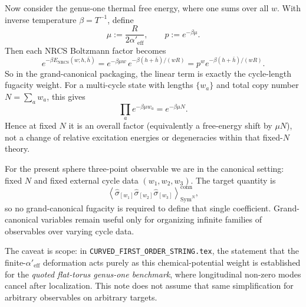 \documentclass[11pt]{article}
\newcommand{\Sym}{\mathrm{Sym}}
\newcommand{\Aeff}{\alpha'_{\mathrm{eff}}}
\begin{document}
Now consider the genus-one thermal free energy, where one sums over all $w$. With inverse temperature $\beta=T^{-1}$, define
\begin{equation}
\mu:=\frac{R}{2\Aeff},
\qquad
p:=e^{-\beta\mu}.
\end{equation}
Then each NRCS Boltzmann factor becomes
\begin{equation}
e^{-\beta E_{\mathrm{NRCS}}(w;h,\bar h)}
=
e^{-\beta\mu w}\,e^{-\beta(h+\bar h)/(wR)}
=
p^w e^{-\beta(h+\bar h)/(wR)}.
\end{equation}
So in the grand-canonical packaging, the linear term is exactly the cycle-length fugacity weight. For a multi-cycle state with lengths $\{w_a\}$ and total copy number $N=\sum_a w_a$, this gives
\begin{equation}
\prod_a e^{-\beta\mu w_a}=e^{-\beta\mu N}.
\end{equation}
Hence at fixed $N$ it is an overall factor (equivalently a free-energy shift by $\mu N$), not a change of relative excitation energies or degeneracies within that fixed-$N$ theory.

For the present sphere three-point observable we are in the canonical setting: fixed $N$ and fixed external cycle data $(w_1,w_2,w_3)$. The target quantity is
\begin{equation}
\left\langle
\widehat{\sigma}_{[w_1]}\widehat{\sigma}_{[w_2]}\widehat{\sigma}_{[w_3]}
\right\rangle_{\Sym^N}^{\mathrm{conn}},
\end{equation}
so no grand-canonical fugacity is required to define that single coefficient. Grand-canonical variables remain useful only for organizing infinite families of observables over varying cycle data.

The caveat is scope: in \texttt{CURVED\_FIRST\_ORDER\_STRING.tex}, the statement that the finite-$\Aeff$ deformation acts purely as this chemical-potential weight is established for the \emph{quoted flat-torus genus-one benchmark}, where longitudinal non-zero modes cancel after localization. This note does not assume that same simplification for arbitrary observables on arbitrary targets.
\end{document}
